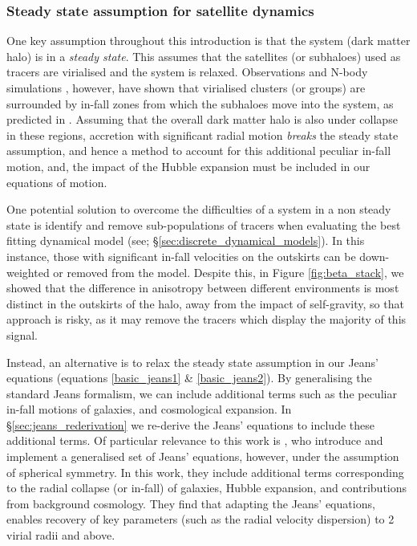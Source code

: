 \subsubsection{Steady state assumption for satellite dynamics}
One key assumption throughout this introduction is that the system (dark matter halo) is in a \textit{steady state}. This assumes that the satellites (or subhaloes) used as tracers are virialised and the system is relaxed. Observations \citep[e.g.][]{mamon2005} and N-body simulations \citep[e.g.][]{mahajan2011}, however, have shown that virialised clusters (or groups) are surrounded by in-fall zones from which the subhaloes move into the system, as predicted in \citet{gunn1972}. Assuming that the overall dark matter halo is also under collapse in these regions, accretion with significant radial motion \textit{breaks} the steady state assumption, and hence a method to account for this additional peculiar in-fall motion, and, the impact of the Hubble expansion must be included in our equations of motion.

One potential solution to overcome the difficulties of a system in a non steady state is identify and remove sub-populations of tracers when evaluating the best fitting dynamical model (see; \S\ref{sec:discrete_dynamical_models}). In this instance, those with significant in-fall velocities on the outskirts can be down-weighted or removed from the model. Despite this, in Figure \ref{fig:beta_stack}, we showed that the difference in anisotropy between different environments is most distinct in the outskirts of the halo, away from the impact of self-gravity, so that approach is risky, as it may remove the tracers which display the majority of this signal.

Instead, an alternative is to relax the steady state assumption in our Jeans' equations (equations \ref{basic_jeans1} \& \ref{basic_jeans2}). By generalising the standard Jeans formalism, we can include additional terms such as the peculiar in-fall motions of galaxies, and cosmological expansion. In \S\ref{sec:jeans_rederivation} we re-derive the Jeans' equations to include these additional terms. Of particular relevance to this work is \citet{falco2013}, who introduce and implement a generalised set of Jeans' equations, however, under the assumption of spherical symmetry. In this work, they include additional terms corresponding to the radial collapse (or in-fall) of galaxies, Hubble expansion, and contributions from background cosmology. They find that adapting the Jeans' equations, enables recovery of key parameters (such as the radial velocity dispersion) to 2 virial radii and above. 

